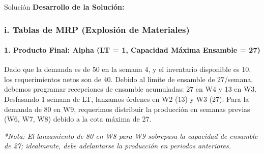 \documentclass[11pt, a4paper]{article}
\begin{document}
  \medskip
  \begin{ejercicio}{Solución}
  \textbf{Desarrollo de la Solución:}

  \subsubsection*{i. Tablas de MRP (Explosión de Materiales)}

  \paragraph{1. Producto Final: Alpha (LT = 1, Capacidad Máxima Ensamble = 27)}
  Dado que la demanda es de 50 en la semana 4, y el inventario disponible es 10, los requerimientos netos son de 40. Debido al límite de ensamble de 27/semana, debemos programar recepciones de ensamble acumuladas: 27 en W4 y 13 en W3. Desfasando 1 semana de LT, lanzamos órdenes en W2 (13) y W3 (27).
  Para la demanda de 80 en W9, requerimos distribuir la producción en semanas previas (W6, W7, W8) debido a la cota máxima de 27.

  \begin{center}
  \end{center}
  \textit{*Nota: El lanzamiento de 80 en W8 para W9 sobrepasa la capacidad de ensamble de 27; idealmente, debe adelantarse la producción en periodos anteriores.}


\end{ejercicio}
\end{document}

